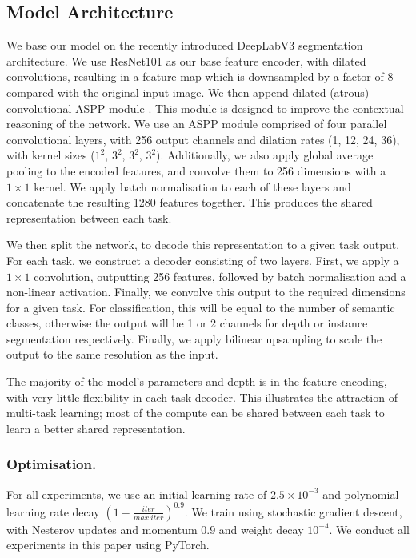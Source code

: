 \subsection{Model Architecture}
We base our model on the recently introduced DeepLabV3 \citep{chen2017rethinking} segmentation architecture.
We use ResNet101 \citep{he2016deep} as our base feature encoder, with dilated convolutions, resulting in a feature map which is downsampled by a factor of 8 compared with the original input image. 
We then append dilated (atrous) convolutional ASPP module \citep{chen2017rethinking}. This module is designed to improve the contextual reasoning of the network. We use an ASPP module comprised of four parallel convolutional layers, with 256 output channels and dilation rates (1, 12, 24, 36), with kernel sizes ($1^2$, $3^2$, $3^2$, $3^2$). Additionally, we also apply global average pooling to the encoded features, and convolve them to 256 dimensions with a $1 \times 1$ kernel. We apply batch normalisation to each of these layers and concatenate the resulting 1280 features together. This produces the shared representation between each task.

We then split the network, to decode this representation to a given task output. For each task, we construct a decoder consisting of two layers. First, we apply a $1 \times 1$ convolution, outputting 256 features, followed by batch normalisation and a non-linear activation. Finally, we convolve this output to the required dimensions for a given task. For classification, this will be equal to the number of semantic classes, otherwise the output will be 1 or 2 channels for depth or instance segmentation respectively. Finally, we apply bilinear upsampling
to scale the output to the same resolution as the input.

The majority of the model's parameters and depth is in the feature encoding, with very little flexibility in each task decoder. This illustrates the attraction of multi-task learning; most of the compute can be shared between each task to learn a better shared representation.

\subsubsection{Optimisation.}
For all experiments, we use an initial learning rate of $2.5\times10^{-3}$ and polynomial learning rate decay $(1-\frac{iter}{max~iter})^{0.9}$. We train using stochastic gradient descent, with Nesterov updates and momentum $0.9$ and weight decay $10^{-4}$. We conduct all experiments in this paper using PyTorch.


